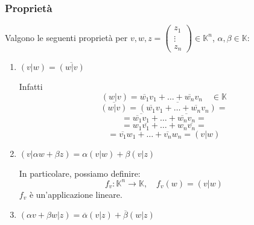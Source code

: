 \documentclass[a4paper]{article}
\theoremstyle{break}
\theoremstyle{break}
\theoremstyle{break}
\theoremstyle{break}
\begin{document}
\subsubsection{Proprietà}
Valgono le seguenti proprietà per \( v,w,z = \begin{pmatrix} z_1\\\vdots\\z_n \end{pmatrix} \in \mathbb{K}^n \),
\( \alpha,\beta \in \mathbb{K} \):
\begin{enumerate}
  \item \( (v|w) = \overline{(w|v)} \)

    \noindent Infatti \[
      (w|v) = \overline{w_1}v_1 + \ldots + \overline{w_n}v_n \quad \in \mathbb{K}
    \]
    \[
      \overline{(w|v)} = \overline{(\overline{w_1}v_1 + \ldots + \overline{w_n}v_n)} =
    \] 
    \[
      = \overline{\overline{w_1}v_1} + \ldots + \overline{\overline{w_n}v_n} =
    \] 
    \[
      = w_1\overline{v_1} + \ldots + w_n\overline{v_n} =
    \] 
    \[
     = \overline{v_1}w_1 + \ldots + \overline{v_n}w_n = (v|w)
    \] 

  \item \( (v|\alpha w + \beta z) = \alpha (v|w) + \beta (v|z) \) 

    \noindent In particolare, possiamo definire:
    \[
    f_v: \mathbb{K}^n \to \mathbb{K}, \quad f_v(w) = (v|w)
    \] 
    \( f_v \) è un'applicazione lineare.

  \item \( (\alpha v + \beta w|z) = \overline{\alpha}(v|z) + \overline{\beta}(w|z) \) 


\end{enumerate}
\end{document}
